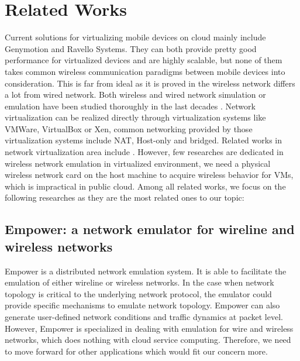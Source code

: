 \documentclass[journal,comsoc]{IEEEtran}
\begin{document}
\section{Related Works}
Current solutions for virtualizing mobile devices on cloud mainly include Genymotion  \cite{genymotion} and Ravello Systems. They can both provide pretty good performance for virtualized devices and are highly scalable, but none of them takes common wireless communication paradigms between mobile devices into consideration. This is far from ideal as it is proved in \cite{cen2003end} the wireless network differs a lot from wired network. Both wireless and wired network simulation or emulation have been studied thoroughly in the last decades \cite{zheng2003empower} \cite{judd2005using}. Network virtualization can be realized directly through virtualization systems like VMWare, VirtualBox or Xen, common networking provided by those virtualization systems include NAT, Host-only and bridged. Related works in network virtualization area include \cite{menon2006optimizing} \cite{chowdhury2009network}. However, few researches are dedicated in wireless network emulation in virtualized environment, we need a physical wireless network card on the host machine to acquire wireless behavior for VMs, which is impractical in public cloud. Among all related works, we focus on the following researches as they are the most related ones to our topic:
\subsection{Empower: a network emulator for wireline and wireless networks}
Empower\cite{zheng2003empower} is a distributed network emulation system. It is able to facilitate the emulation of either wireline or wireless networks. In the case when network topology is critical to the underlying network protocol, the emulator could provide specific mechanisms to emulate network topology. Empower can also generate user-defined network conditions and traffic dynamics at packet level.
However,  Empower is specialized in dealing with emulation for wire and wireless networks, which does nothing with cloud service computing. Therefore, we need to move forward for other applications which would fit our concern more.
\end{document}
